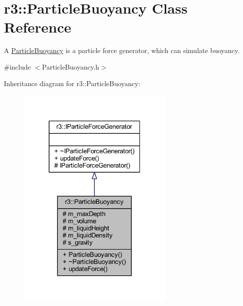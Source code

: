 \hypertarget{classr3_1_1_particle_buoyancy}{}\section{r3\+:\+:Particle\+Buoyancy Class Reference}
\label{classr3_1_1_particle_buoyancy}


A \mbox{\hyperlink{classr3_1_1_particle_buoyancy}{Particle\+Buoyancy}} is a particle force generator, which can simulate buoyancy.  




{\ttfamily \#include $<$Particle\+Buoyancy.\+h$>$}



Inheritance diagram for r3\+:\+:Particle\+Buoyancy\+:\nopagebreak
\begin{figure}[H]
\begin{center}
\leavevmode
\includegraphics[width=220pt]{classr3_1_1_particle_buoyancy__inherit__graph}
\end{center}
\end{figure}


